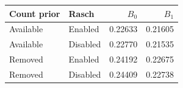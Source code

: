 \begin{tabular}{llrr}
\toprule
Count prior & Rasch & $B_0$ & $B_1$\\
\midrule
Available & Enabled & 0.22633 & 0.21605\\
Available & Disabled & 0.22770 & 0.21535\\
Removed & Enabled & 0.24192 & 0.22675\\
Removed & Disabled & 0.24409 & 0.22738\\
\bottomrule
\end{tabular}
